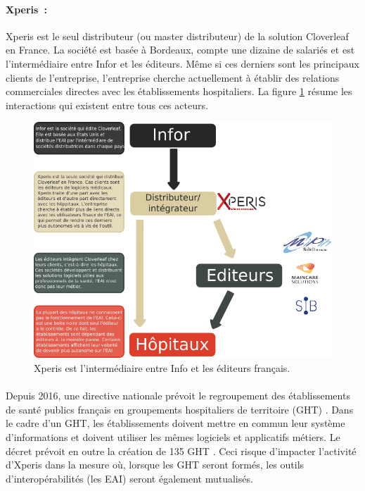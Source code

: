 			\paragraph{Xperis~:}
			Xperis est le seul distributeur (ou master distributeur) de la solution
			Cloverleaf en France. La société est basée à Bordeaux, compte une dizaine de
			salariés et est l'intermédiaire entre Infor et les éditeurs.
			Même si ces derniers sont les principaux clients de l'entreprise,
			l'entreprise cherche actuellement à établir des relations commerciales
			directes avec les établissements hospitaliers.\newline
			La figure \ref{xperis_secteur} résume les interactions qui existent entre
			tous ces acteurs.
			\begin{figure}[H]%
				\centering
				\includegraphics[width=17cm]{../img/xperis_secteur.png}
				\caption{\label{xperis_secteur} Xperis est l'intermédiaire entre Info et
				les éditeurs français.}
			\end{figure}
			
			\paragraph{}%
			Depuis 2016, une directive nationale prévoit le regroupement des établissements de 
			santé publics français en groupements hospitaliers de territoire (GHT) 
			\citep{valls_decret_2016}. Dans le cadre d'un GHT, les établissements doivent mettre 
			en commun leur système d'informations et doivent utiliser les mêmes logiciels et 
			applicatifs métiers. Le décret prévoit en outre la création de 135 GHT  
			\citep{touraine_marisol_2016}. Ceci risque d'impacter l'activité d'Xperis dans la 
			mesure où, lorsque les GHT seront formés, les outils d'interopérabilités 
			(les EAI) seront également mutualisés.
			
